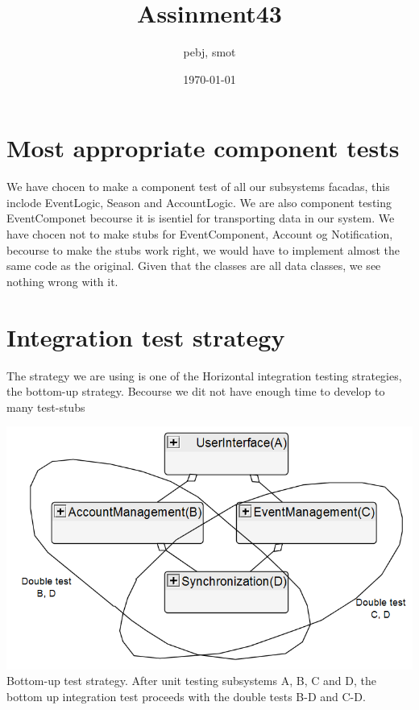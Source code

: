 \documentclass[a4paper]{article}
\title{Assinment43}
\author{pebj, smot}
\date{\today}
\begin{document}
\maketitle

\section{Most appropriate component tests}
	We have chocen to make a component test of all our  subsystems facadas, this inclode EventLogic, Season and AccountLogic. We are also component testing EventComponet becourse it is isentiel for transporting data in our system. We have chocen not to make stubs for EventComponent, Account og Notification, becourse to make the stubs work right, we would have to implement almost the same code as the original. Given that the classes are all data classes, we see nothing wrong with it.
    
\section{Integration test strategy}
   	The strategy we are using is one of the Horizontal integration testing strategies, the bottom-up strategy. 
    	Becourse we dit not have enough time to develop to many test-stubs


	\begin{table}
		\centering
		\includegraphics[width=1\textwidth]{UMLtestDiagram.PNG}\\
		\caption{Bottom-up test strategy. After unit testing subsystems A, B, C and D, the bottom up integration 
			test proceeds with the double tests B-D and C-D.}
	\end{table}
\end{document}
